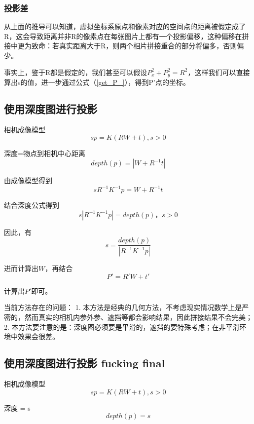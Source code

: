 \subsubsection{投影差}
从上面的推导可以知道，虚拟坐标系原点和像素对应的空间点的距离被假定成了R，这会导致距离并非R的像素点在每张图片上都有一个投影偏移，这种偏移在拼接中更为致命：若真实距离大于R，则两个相片拼接重合的部分将偏多，否则偏少。
\par
事实上，鉴于R都是假定的，我们甚至可以假设$P_x^2 + P_y^2 = R^2$，这样我们可以直接算出s的值，进一步通过公式（\ref{get_P_}），得到P'点的坐标。

\subsection{使用深度图进行投影}
\par 相机成像模型
\begin{equation}
  s p = K (R W + t) , s>0
\end{equation}
\par 深度=物点到相机中心距离
\begin{equation}
  depth(p) = |W + R^{-1} t|
\end{equation}

\par 由成像模型得到
\begin{equation}
  s R^{-1} K^{-1} p = W + R^{-1} t
\end{equation}
\par 结合深度公式得到
\begin{equation}
  s | R^{-1} K^{-1} p | = depth(p)， s>0
\end{equation}
\par 因此，有
\begin{equation}
  s  = \frac{depth(p)}{| R^{-1} K^{-1} p |}
\end{equation}
\par 进而计算出$W$，再结合
\begin{equation}
  P' = R' W + t'
\end{equation}
\par 计算出$P'$即可。
\par 当前方法存在的问题：
1. 本方法是经典的几何方法，不考虑现实情况数学上是严密的，然而真实的相机内参外参、遮挡等都会影响结果，因此拼接结果不会完美；
2. 本方法要注意的是：深度图必须要是平滑的，遮挡的要特殊考虑；在非平滑环境中效果会很差。

\subsection{使用深度图进行投影 fucking final}
\par 相机成像模型
\begin{equation}
  s p = K (R W + t) , s>0
\end{equation}
\par 深度 = s
\begin{equation}
  depth(p) = s
\end{equation}


